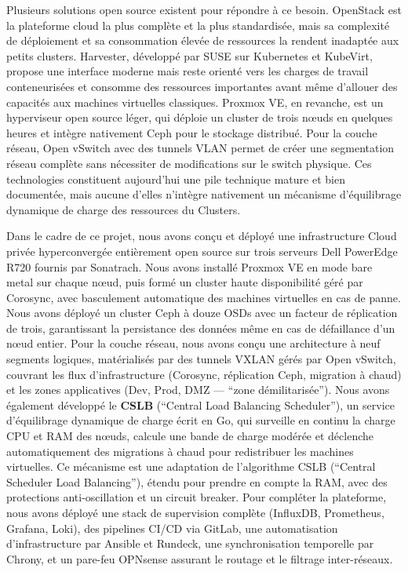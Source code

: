 \par Plusieurs solutions open source existent pour répondre à ce besoin. OpenStack est la plateforme cloud la plus complète et la plus standardisée, mais sa complexité de déploiement et sa consommation élevée de ressources la rendent inadaptée aux petits clusters. Harvester, développé par SUSE sur Kubernetes et KubeVirt, propose une interface moderne mais reste orienté vers les charges de travail conteneurisées et consomme des ressources importantes avant même d'allouer des capacités aux machines virtuelles classiques. Proxmox VE, en revanche, est un hyperviseur open source léger, qui déploie un cluster de trois n\oe{}uds en quelques heures et intègre nativement Ceph pour le stockage distribué. Pour la couche réseau, Open vSwitch avec des tunnels VLAN permet de créer une segmentation réseau complète sans nécessiter de modifications sur le switch physique. Ces technologies constituent aujourd'hui une pile technique mature et bien documentée, mais aucune d'elles n'intègre nativement un mécanisme d'équilibrage dynamique de charge des ressources du Clusters.\\

\par Dans le cadre de ce projet, nous avons conçu et déployé une infrastructure Cloud privée hyperconvergée entièrement open source sur trois serveurs Dell PowerEdge R720 fournis par Sonatrach. Nous avons installé Proxmox VE en mode bare metal sur chaque n\oe{}ud, puis formé un cluster haute disponibilité géré par Corosync, avec basculement automatique des machines virtuelles en cas de panne. Nous avons déployé un cluster Ceph à douze OSDs avec un facteur de réplication de trois, garantissant la persistance des données même en cas de défaillance d'un n\oe{}ud entier. Pour la couche réseau, nous avons conçu une architecture à neuf segments logiques, matérialisés par des tunnels VXLAN gérés par Open vSwitch, couvrant les flux d'infrastructure (Corosync, réplication Ceph, migration à chaud) et les zones applicatives (Dev, Prod, DMZ --- ``zone démilitarisée''). Nous avons également développé le \textbf{CSLB} (``Central Load Balancing Scheduler''), un service d'équilibrage dynamique de charge écrit en Go, qui surveille en continu la charge CPU et RAM des n\oe{}uds, calcule une bande de charge modérée et déclenche automatiquement des migrations à chaud pour redistribuer les machines virtuelles. Ce mécanisme est une adaptation de l'algorithme CSLB (``Central Scheduler Load Balancing''), étendu pour prendre en compte la RAM, avec des protections anti-oscillation et un circuit breaker. Pour compléter la plateforme, nous avons déployé une stack de supervision complète (InfluxDB, Prometheus, Grafana, Loki), des pipelines CI/CD via GitLab, une automatisation d'infrastructure par Ansible et Rundeck, une synchronisation temporelle par Chrony, et un pare-feu OPNsense assurant le routage et le filtrage inter-réseaux.\\

